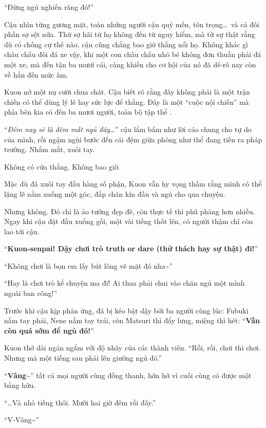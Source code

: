 \documentclass[../main.tex]{subfiles}
\begin{document}
``Đừng ngủ nghiến răng đó!''

Cậu nhìn từng gương mặt, toàn những người cậu quý mến, tôn trọng\dots\ và cả đôi phần sợ sệt nữa. Thứ sợ hãi từ họ không đến từ nguy hiểm, mà từ sự thật rằng dù có chống cự thế nào, cậu cũng chẳng bao giờ thắng nổi họ. Không khác gì châu chấu đòi đá xe vậy, khi một con châu chấu nhỏ bé không đơn thuần phải đá một xe, mà đến tận ba mươi cái, càng khiến cho cơ hội của nó đã dê-rô nay còn về hẳn đến mức âm.

Kuon nở một nụ cười chua chát. Cậu biết rõ rằng đây không phải là một trận chiến có thể dùng lý lẽ hay sức lực để thắng. Đây là một ``cuộc nội chiến'' mà phía bên kia có đến ba mươi người, toàn bộ tập thể \hll.

``\textit{Đêm nay sẽ là đêm mất ngủ đây\dots}'' cậu lẩm bẩm như lời cáo chung cho tự do của mình, rồi ngậm ngùi bước đến cái đệm giữa phòng như thể đang tiến ra pháp trường. Nhắm mắt, xuôi tay.

Không có cửa thắng. Không bao giờ.

\ct

Mặc dù đã xuôi tay đầu hàng số phận, Kuon vẫn hy vọng thầm rằng mình có thể lặng lẽ nằm xuống một góc, đắp chăn kín đầu và ngủ cho qua chuyện.

Nhưng không. Đó chỉ là ảo tưởng đẹp đẽ, còn thực tế thì phũ phàng hơn nhiều. Ngay khi cậu đặt đầu xuống gối, một vài tiếng thốt lên, có người thậm chí còn lao tới cậu.

``\textbf{Kuon-senpai! Dậy chơi trò truth or dare (thử thách hay sự thật) đi!}''

``Không chơi là bọn em lấy bút lông vẽ mặt đó nha\~{}''

``Hay là chơi trò kể chuyện ma đi! Ai thua phải chui vào chăn ngủ một mình ngoài ban công!''

Trước khi cậu kịp phản ứng, đã bị kéo bật dậy bởi ba người cùng lúc: Fubuki nắm tay phải, Nene nắm tay trái, còn Matsuri thì đẩy lưng, miệng thì hét: ``\textbf{Vẫn còn quá sớm để ngủ đó!}''

Kuon thở dài ngán ngẩm với độ nhây của các thành viên. ``Rồi, rồi, chơi thì chơi. Nhưng mà một tiếng sau phải lên giường ngủ đó.''

``\textbf{Vâng\~{}}'' tất cả mọi người cùng đồng thanh, hớn hở vì cuối cùng có được một bằng hữu.

``\dots Và nhỏ tiếng thôi. Mười hai giờ đêm rồi đấy.''

``V-Vâng\~{}''

\ct
\end{document}
